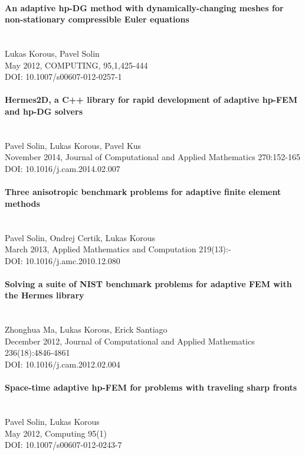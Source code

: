 \paragraph{An adaptive hp-DG method with dynamically-changing meshes for non-stationary compressible Euler equations}\ \\
Lukas Korous, Pavel Solin\\
May 2012, COMPUTING, 95,1,425-444\\
DOI: 10.1007/s00607-012-0257-1\\

\paragraph{Hermes2D, a C++ library for rapid development of adaptive hp-FEM and hp-DG solvers}\ \\
Pavel Solin, Lukas Korous, Pavel Kus\\
November 2014, Journal of Computational and Applied Mathematics 270:152-165\\
DOI: 10.1016/j.cam.2014.02.007\\

\paragraph{Three anisotropic benchmark problems for adaptive finite element methods}\ \\
Pavel Solin, Ondrej Certik, Lukas Korous\\
March 2013, Applied Mathematics and Computation 219(13):-\\
DOI: 10.1016/j.amc.2010.12.080\\

\paragraph{Solving a suite of NIST benchmark problems for adaptive FEM with the Hermes library}\ \\
Zhonghua Ma, Lukas Korous, Erick Santiago\\
December 2012, Journal of Computational and Applied Mathematics 236(18):4846-4861\\
DOI: 10.1016/j.cam.2012.02.004\\

\paragraph{Space-time adaptive hp-FEM for problems with traveling sharp fronts}\ \\
Pavel Solin, Lukas Korous\\
May 2012, Computing 95(1)\\
DOI: 10.1007/s00607-012-0243-7\\


